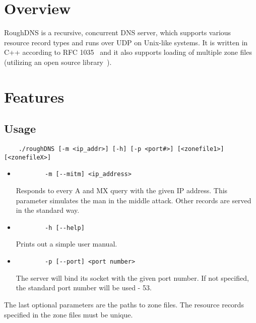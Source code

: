 \documentclass[12pt,a4paper,titlepage,final]{article}
\begin{document}


\pagestyle{plain}
\setcounter{page}{1}
\tableofcontents

\newpage
\pagestyle{plain}
\setcounter{page}{1}

\section{Overview} 
RoughDNS is a recursive, concurrent DNS server, which supports various resource record types and runs over UDP on Unix-like systems. It is written in C++ according to RFC 1035~\cite{rfc1035} and it also supports loading of multiple zone files (utilizing an open source library~\cite{ldns}).

\section{Features} \label{sec:features}
\subsection{Usage}
\begin{verbatim}
	./roughDNS [-m <ip_addr>] [-h] [-p <port#>] [<zonefile1>] [<zonefileX>]
\end{verbatim}
\begin{itemize}
	\item
		\begin{verbatim}
		-m [--mitm] <ip_address>
		\end{verbatim}
		Responds to every A and MX query with the given IP address. This parameter simulates the man in the middle attack. Other records are served in the standard way.
	\item 
		\begin{verbatim}
		-h [--help]
		\end{verbatim}
		Prints out a simple user manual.
	\item
		\begin{verbatim}
		-p [--port] <port number>
		\end{verbatim}
		The server will bind its socket with the given port number. If not specified, the standard port number will be used - 53.
\end{itemize}
The last optional parameters are the paths to zone files. The resource records specified in the zone files must be unique.
\end{document}
